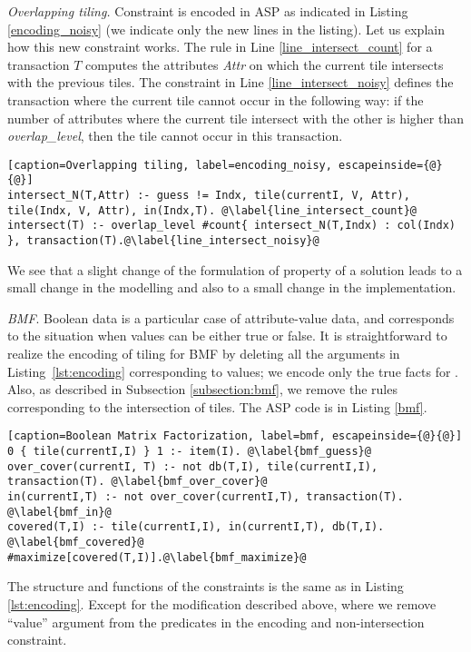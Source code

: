 \lstset{
  basicstyle=\footnotesize,
}

\textit{Overlapping tiling.} Constraint \overlappingTilesConstraint is encoded in ASP as indicated in Listing \ref{encoding_noisy} (we indicate only the new lines in the listing). Let us explain how this new constraint works. The rule in Line \ref{line_intersect_count} for a transaction $T$ computes the attributes \textit{Attr} on which the current tile intersects with the previous tiles. The constraint in Line \ref{line_intersect_noisy} defines the transaction where the current tile cannot occur in the following way: if the number of attributes where the current tile intersect with the other is higher than \textit{overlap\_level}, then the tile cannot occur in this transaction.

\begin{lstlisting}[caption=Overlapping tiling, label=encoding_noisy, escapeinside={@}{@}] 
intersect_N(T,Attr) :- guess != Indx, tile(currentI, V, Attr), tile(Indx, V, Attr), in(Indx,T). @\label{line_intersect_count}@
intersect(T) :- overlap_level #count{ intersect_N(T,Indx) : col(Indx) }, transaction(T).@\label{line_intersect_noisy}@
\end{lstlisting}

We see that a slight change of the formulation of property of a solution leads to a small change in the modelling and also to a small change in the implementation.

\textit{BMF}. Boolean data is a particular case of attribute-value data, and corresponds to the situation when values can be either true or false.  It is straightforward to realize the encoding of tiling for BMF by deleting all the arguments in Listing~\ref{lst:encoding} corresponding to values; we encode only the true facts for \dbbin. Also, as described in Subsection \ref{subsection:bmf}, we remove the rules corresponding to the intersection of tiles. The ASP code is in Listing \ref{bmf}. 
\begin{lstlisting}[caption=Boolean Matrix Factorization, label=bmf, escapeinside={@}{@}] 
0 { tile(currentI,I) } 1 :- item(I). @\label{bmf_guess}@
over_cover(currentI, T) :- not db(T,I), tile(currentI,I), transaction(T). @\label{bmf_over_cover}@
in(currentI,T) :- not over_cover(currentI,T), transaction(T). @\label{bmf_in}@
covered(T,I) :- tile(currentI,I), in(currentI,T), db(T,I). @\label{bmf_covered}@
#maximize[covered(T,I)].@\label{bmf_maximize}@
\end{lstlisting}

The structure and functions of the constraints is the same as in Listing \ref{lst:encoding}. Except for the modification described above, where we remove ``value'' argument from the predicates in the encoding and non-intersection constraint.

